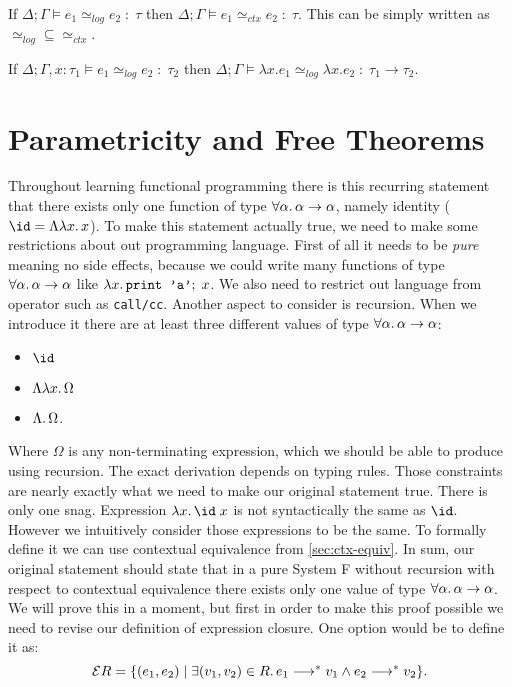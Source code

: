 \begin{theorem}[Soundness]\label{thm:soundness-bin-log-rel}
  If $\Delta; \Gamma \models e_1 \simeq_{log} e_2 \;:\; \tau$
  then $\Delta; \Gamma \models e_1 \simeq_{ctx} e_2 \;:\; \tau$.
  This can be simply written as $\simeq_{log} \subseteq \simeq_{ctx}$.
\end{theorem}

\begin{lemma}
  If $\Delta; \Gamma, x : \tau_1 \models e_1 \simeq_{log} e_2 \;:\; \tau_2$ then
  $\Delta; \Gamma \models \lambda x.e_1 \simeq_{log} \lambda x.e_2 \;:\; \tau_1 \to \tau_2$.
\end{lemma}

\section{Parametricity and Free Theorems}

Throughout learning functional programming there is this recurring statement
that there exists only one function of type
$\forall\alpha\ldotp\alpha\to\alpha$,
namely identity ($\id = \Lambda\lambda x\ldotp x$).
To make this statement actually true, we need to make some restrictions about
out programming language. First of all it needs to be \emph{pure} meaning no
side effects, because we could write many functions of type
$\forall\alpha\ldotp\alpha\to\alpha$ like
$\lambda x\ldotp\texttt{print 'a'};\;x$.
We also need to restrict out language from operator such as \texttt{call/cc}.
Another aspect to consider is recursion. When we introduce it there are at
least three different values of type $\forall\alpha\ldotp\alpha\to\alpha$:
\begin{itemize}
  \item $\id$
  \item $\Lambda \lambda x\ldotp\Omega$
  \item $\Lambda \ldotp\Omega$.
\end{itemize}
Where $\Omega$ is any non-terminating expression, which we should be able
to produce using recursion. The exact derivation depends on typing rules.
Those constraints are nearly exactly what we need to make our original
statement true. There is only one snag. Expression $\lambda x\ldotp \id\; x$
is not syntactically the same as $\id$. However we intuitively consider those
expressions to be the same. To formally define it we can use
contextual equivalence from \autoref{sec:ctx-equiv}. In sum, our original
statement should state that in a pure System F without recursion with
respect to contextual equivalence there exists only one value of type
$\forall\alpha\ldotp\alpha\to\alpha$. We will prove this in a moment,
but first in order to make this proof possible we need to revise our
definition of expression closure. One option would be to define it as:
  \[
    \mathcal E R= \{ (e_1, e_2) \mid \exists (v_1, v_2) \in R\ldotp
      e_1 \longrightarrow^* v_1 \wedge e_2 \longrightarrow^* v_2 \}.
  \]

